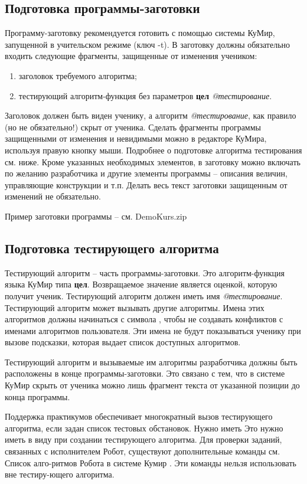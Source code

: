 \subsection {Подготовка программы-заготовки} \label{setup}
Программу-заготовку рекомендуется готовить с помощью системы КуМир, запущенной в учительском режиме (ключ -t). В заготовку должны обязательно входить следующие фрагменты, защищенные от изменения учеником:
\begin{enumerate}
\item	заголовок требуемого алгоритма;
\item	 тестирующий алгоритм-функция без параметров \textbf{цел} \emph{@тестирование}. 
	\end{enumerate}
	Заголовок должен быть виден ученику, а алгоритм \emph{@тестирование}, как правило (но не обязательно!) скрыт от ученика. Сделать фрагменты программы защищенными от изменения и невидимыми можно в редакторе КуМира, используя правую кнопку мыши. Подробнее о подготовке алгоритма тестирования см. ниже.
	Кроме указанных необходимых элементов, в заготовку можно включать по желанию разработчика и другие элементы программы – описания величин, управляющие конструкции и т.п. Делать весь текст заготовки защищенным от изменений не обязательно.
	
	Пример заготовки программы – см. DemoKurs.zip 

\subsection {Подготовка тестирующего алгоритма }
           Тестирующий алгоритм – часть программы-заготовки. Это алгоритм-функция   языка КуМир типа 
           \textbf{цел}. Возвращаемое значение является оценкой, которую получит ученик. Тестирующий алгоритм должен иметь имя 
           \emph{@тестирование}. 
	Тестирующий алгоритм может вызывать другие алгоритмы. Имена этих алгоритмов должны начинаться с символа , чтобы не создавать конфликтов с именами алгоритмов пользователя. Эти имена не будут показываться ученику при вызове подсказки, которая выдает список доступных алгоритмов.
	
	
	Тестирующий алгоритм и вызываемые им алгоритмы разработчика должны быть расположены в конце программы-заготовки. Это связано с тем, что в системе КуМир скрыть от ученика можно лишь фрагмент текста от указанной позиции до конца программы.
	
	
	Поддержка практикумов обеспечивает многократный вызов тестирующего алгоритма, если задан список тестовых обстановок. Нужно иметь Это нужно иметь в виду при создании тестирующего алгоритма. Для проверки заданий, связанных с исполнителем Робот, существуют дополнительные команды см.  Список алго-ритмов Робота в системе Кумир . Эти команды нельзя использовать вне тестиру-ющего алгоритма.

